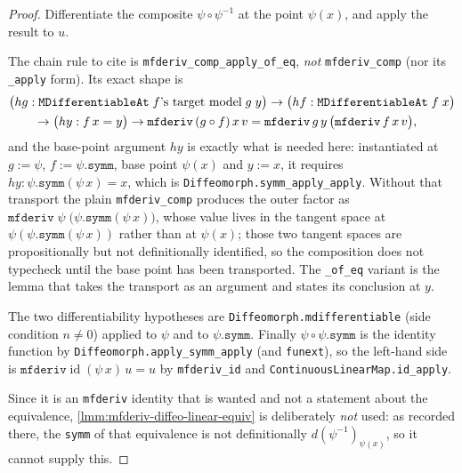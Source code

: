 \begin{proof}
    \leanok
    Differentiate the composite $\psi \circ \psi^{-1}$ at the point $\psi(x)$, and apply the result to $u$.

    The chain rule to cite is \texttt{mfderiv\_comp\_apply\_of\_eq}, \emph{not} \texttt{mfderiv\_comp} (nor its \texttt{\_apply} form). Its exact shape is
    \begin{align}
        &\big(hg : \mathtt{MDifferentiableAt}\;f\text{'s target model}\;g\;y\big) \to \big(hf : \mathtt{MDifferentiableAt}\;f\;x\big) \notag \\
        &\qquad \to \big(hy : f\,x = y\big) \to \mathtt{mfderiv}\,(g \circ f)\,x\,v = \mathtt{mfderiv}\,g\,y\,\big(\mathtt{mfderiv}\,f\,x\,v\big),
    \end{align}
    and the base-point argument $hy$ is exactly what is needed here: instantiated at $g := \psi$, $f := \psi.\mathtt{symm}$, base point $\psi(x)$ and $y := x$, it requires $hy : \psi.\mathtt{symm}(\psi\,x) = x$, which is \texttt{Diffeomorph.symm\_apply\_apply}. Without that transport the plain \texttt{mfderiv\_comp} produces the outer factor as $\mathtt{mfderiv}\;\psi\;\big(\psi.\mathtt{symm}(\psi\,x)\big)$, whose value lives in the tangent space at $\psi(\psi.\mathtt{symm}(\psi\,x))$ rather than at $\psi(x)$; those two tangent spaces are propositionally but not definitionally identified, so the composition does not typecheck until the base point has been transported. The \texttt{\_of\_eq} variant is the lemma that takes the transport as an argument and states its conclusion at $y$.

    The two differentiability hypotheses are \texttt{Diffeomorph.mdifferentiable} (side condition $n \neq 0$) applied to $\psi$ and to $\psi.\mathtt{symm}$. Finally $\psi \circ \psi.\mathtt{symm}$ is the identity function by \texttt{Diffeomorph.apply\_symm\_apply} (and \texttt{funext}), so the left-hand side is $\mathtt{mfderiv}\;\mathrm{id}\;(\psi\,x)\,u = u$ by \texttt{mfderiv\_id} and \texttt{ContinuousLinearMap.id\_apply}.

    Since it is an \texttt{mfderiv} identity that is wanted and not a statement about the equivalence, \ref{lmm:mfderiv-diffeo-linear-equiv} is deliberately \emph{not} used: as recorded there, the \texttt{symm} of that equivalence is not definitionally $d(\psi^{-1})_{\psi(x)}$, so it cannot supply this.
\end{proof}


